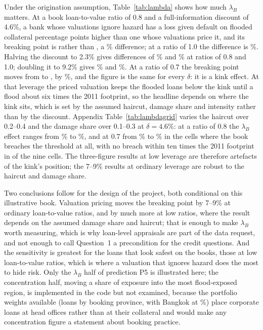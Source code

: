 Under the origination assumption, Table~\ref{tab:lambda} shows how much $\lambda_B$ matters. At a book loan-to-value ratio of 0.8 and a full-information discount of 4.6\%, a bank whose valuations ignore hazard has a loss given default on flooded collateral \lamLgdEightChange{} percentage points higher than one whose valuations price it, and its breaking point is \lamSStarEightZero{} rather than \lamSStarEightOne, a \lamSStarEightChange\% difference; at a ratio of 1.0 the difference is \lamSStarOneChange\%. Halving the discount to 2.3\% gives differences of \lamLoEightChange\% and \lamLoOneChange\% at ratios of 0.8 and 1.0; doubling it to 9.2\% gives \lamHiEightChange\% and \lamHiOneChange\%. At a ratio of 0.7 the breaking point moves from \lamSStarLowLtvZero{} to \lamSStarLowLtvOne, by \lamSStarLowLtvChange\%, and the figure is the same \lamLowLtvOneAll{} for every $\delta$: it is a kink effect. At that leverage the priced valuation keeps the flooded loans below the kink until a flood about six times the 2011 footprint, so the headline depends on where the kink sits, which is set by the assumed haircut, damage share and intensity rather than by the discount. Appendix Table~\ref{tab:lambdagrid} varies the haircut over 0.2--0.4 and the damage share over 0.1--0.3 at $\delta = 4.6\%$: at a ratio of 0.8 the $\lambda_B$ effect ranges from \lamGridEightMin\% to \lamGridEightMax\%, and at 0.7 from \lamGridLowMin\% to \lamGridLowMax\% in the cells where the book breaches the threshold at all, with no breach within ten times the 2011 footprint in \lamGridLowNoBreach{} of the nine cells. The three-figure results at low leverage are therefore artefacts of the kink's position; the 7--9\% results at ordinary leverage are robust to the haircut and damage share.

Two conclusions follow for the design of the project, both conditional on this illustrative book. Valuation pricing moves the breaking point by 7--9\% at ordinary loan-to-value ratios, and by much more at low ratios, where the result depends on the assumed damage share and haircut; that is enough to make $\lambda_B$ worth measuring, which is why loan-level appraisals are part of the data request, and not enough to call Question~1 a precondition for the credit questions. And the sensitivity is greatest for the loans that look safest on the books, those at low loan-to-value ratios, which is where a valuation that ignores hazard does the most to hide risk. Only the $\lambda_B$ half of prediction P5 is illustrated here; the concentration half, moving a share of exposure into the most flood-exposed region, is implemented in the code but not examined, because the portfolio weights available (loans by booking province, with Bangkok at \bkkShare\%) place corporate loans at head offices rather than at their collateral and would make any concentration figure a statement about booking practice.


